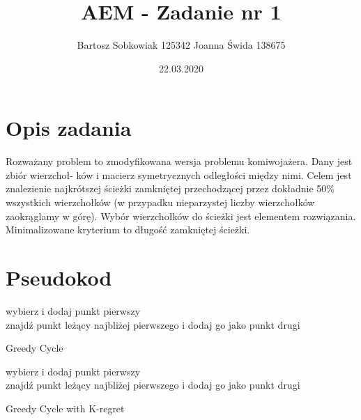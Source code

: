 \documentclass{article}
\title{AEM - Zadanie nr 1}
\author{Bartosz Sobkowiak 125342 Joanna Świda 138675}
\date{22.03.2020}
\begin{document}
\maketitle
\section{Opis zadania}

    Rozważany problem to zmodyfikowana wersja problemu komiwojażera. Dany jest zbiór wierzchoł-
    ków i macierz symetrycznych odległości między nimi. Celem jest znalezienie najkrótszej ścieżki zamkniętej przechodzącej przez dokładnie 50\% wszystkich wierzchołków (w przypadku nieparzystej liczby wierzchołków zaokrąglamy w górę). Wybór wierzchołków do ścieżki jest elementem rozwiązania. Minimalizowane kryterium to długość zamkniętej ścieżki.
    


\section{Pseudokod}

\begin{algorithm}[H]
     
    wybierz i dodaj punkt pierwszy\\
    znajdź punkt leżący najbliżej pierwszego i dodaj go jako punkt drugi\\
\caption{Greedy Cycle}
\end{algorithm}

\vspace{10mm}

\begin{algorithm}[H]
     
    wybierz i dodaj punkt pierwszy\\
    znajdź punkt leżący najbliżej pierwszego i dodaj go jako punkt drugi\\
\caption{Greedy Cycle with K-regret}
\end{algorithm}
\end{document}
